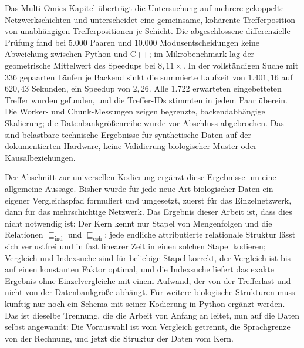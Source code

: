 \documentclass[a4paper,12pt, twoside]{report}
\theoremstyle{definition}
\begin{document}
Das Multi-Omics-Kapitel überträgt die Untersuchung auf mehrere gekoppelte Netzwerkschichten und unterscheidet eine gemeinsame, kohärente Trefferposition von unabhängigen Trefferpositionen je Schicht. Die abgeschlossene differenzielle Prüfung fand bei $5.000$ Paaren und $10.000$ Modusentscheidungen keine Abweichung zwischen Python und C++; im Mikrobenchmark lag der geometrische Mittelwert des Speedups bei $8{,}11\times$. In der vollständigen Suche mit $336$ gepaarten Läufen je Backend sinkt die summierte Laufzeit von $1.401{,}16$ auf $620{,}43$ Sekunden, ein Speedup von $2{,}26$. Alle $1.722$ erwarteten eingebetteten Treffer wurden gefunden, und die Treffer-IDs stimmten in jedem Paar überein. Die Worker- und Chunk-Messungen zeigen begrenzte, backendabhängige Skalierung; die Datenbankgrößenreihe wurde vor Abschluss abgebrochen. Das sind belastbare technische Ergebnisse für synthetische Daten auf der dokumentierten Hardware, keine Validierung biologischer Muster oder Kausalbeziehungen.

Der Abschnitt zur universellen Kodierung ergänzt diese Ergebnisse um eine allgemeine Aussage. Bisher wurde für jede neue Art biologischer Daten ein eigener Vergleichspfad formuliert und umgesetzt, zuerst für das Einzelnetzwerk, dann für das mehrschichtige Netzwerk. Das Ergebnis dieser Arbeit ist, dass dies nicht notwendig ist: Der Kern kennt nur Stapel von Mengenfolgen und die Relationen $\sqsubseteq_{\mathrm{ind}}$ und $\sqsubseteq_{\mathrm{coh}}$; jede endliche attributierte relationale Struktur lässt sich verlustfrei und in fast linearer Zeit in einen solchen Stapel kodieren; Vergleich und Indexsuche sind für beliebige Stapel korrekt, der Vergleich ist bis auf einen konstanten Faktor optimal, und die Indexsuche liefert das exakte Ergebnis ohne Einzelvergleiche mit einem Aufwand, der von der Trefferlast und nicht von der Datenbankgröße abhängt. Für weitere biologische Strukturen muss künftig nur noch ein Schema mit seiner Kodierung in Python ergänzt werden. Das ist dieselbe Trennung, die die Arbeit von Anfang an leitet, nun auf die Daten selbst angewandt: Die Vorauswahl ist vom Vergleich getrennt, die Sprachgrenze von der Rechnung, und jetzt die Struktur der Daten vom Kern.
\end{document}
